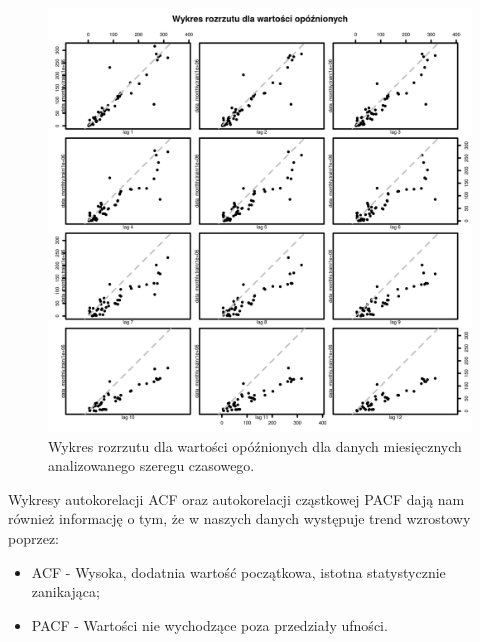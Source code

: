 \documentclass[11pt]{article}
\begin{document}
\begin{figure}[h]

    \centering
	\includegraphics[width=\textwidth]{images/data_monthly_train_opoznienia.png}
    \caption{Wykres rozrzutu dla wartości opóźnionych dla danych miesięcznych analizowanego szeregu czasowego.}
    \label{fig:data_monthly_train_opoznienia}

\end{figure}

\newpage

Wykresy autokorelacji ACF oraz autokorelacji cząstkowej PACF dają nam również informację o tym, że w naszych danych występuje trend wzrostowy poprzez:
\begin{itemize}
\item ACF - Wysoka, dodatnia wartość początkowa, istotna statystycznie zanikająca;
\item PACF - Wartości nie wychodzące poza przedziały ufności.
\end{itemize}
\end{document}
